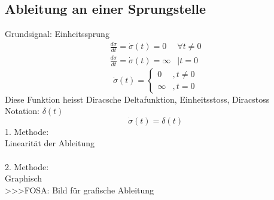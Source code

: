 \subsection{Ableitung an einer Sprungstelle}
Grundsignal: Einheitssprung\\
\[ \boxed{\begin{array}{ll}
\frac{d \sigma}{d t} = \dot{\sigma}(t) = 0 & \forall t \neq 0 \\
\frac{d \sigma}{d t} = \dot{\sigma}(t) = \infty & | t =   0
\end{array}
} \]
\[ \boxed{\dot{\sigma}(t) = \left\lbrace 
\begin{array}{ll}0&, t \neq 0\\\infty&, t = 0\end{array} \right.} \]
Diese Funktion heisst Diracsche Deltafunktion, Einheitsstoss, Diracstoss\\
Notation: $\delta(t)$
\[ \boxed{\dot{\sigma}(t) = \delta(t)} \]
1. Methode: \\
Linearität der Ableitung\\\\
2. Methode: \\
Graphisch\\
>>>FOSA: Bild für grafische Ableitung